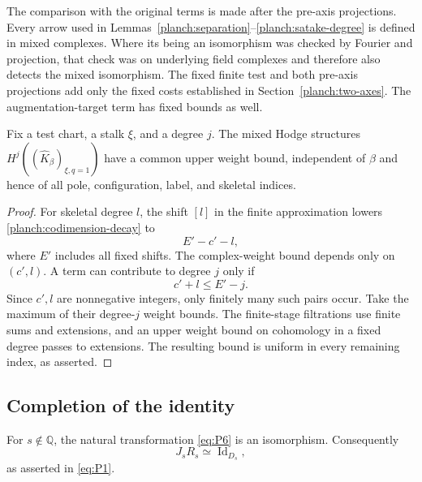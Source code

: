 The comparison with the original terms is made after the pre-axis
projections.  Every arrow used in
Lemmas~\ref{planch:separation}--\ref{planch:satake-degree} is
defined in mixed complexes.  Where its being an isomorphism was
checked by Fourier and projection, that check was on underlying
field complexes and therefore also detects the mixed isomorphism.
The fixed finite test and both pre-axis projections add only the
fixed costs established in Section~\ref{planch:two-axes}.
The augmentation-target term has fixed bounds as well.

\begin{proposition}
\label{planch:weight-estimate}
Fix a test chart, a stalk $\xi$, and a degree $j$.  The mixed Hodge
structures $H^j((\widehat K_\beta)_{\xi,q=1})$ have a common upper
weight bound, independent of $\beta$ and hence of all pole,
configuration, label, and skeletal indices.
\end{proposition}

\begin{proof}
For skeletal degree $l$, the shift $[l]$ in the finite approximation
lowers \eqref{planch:codimension-decay} to
\[
 E'-c'-l,
\]
where $E'$ includes all fixed shifts.  The complex-weight bound
depends only on $(c',l)$.  A term can contribute to degree $j$
only if
\[
 c'+l\leq E'-j.
\]
Since $c',l$ are nonnegative integers, only finitely many such
pairs occur.  Take the maximum of their degree-$j$ weight bounds.
The finite-stage filtrations use finite sums and extensions, and
an upper weight bound on cohomology in a fixed degree passes to
extensions.  The resulting bound is uniform in every remaining
index, as asserted.
\end{proof}

\subsection{Completion of the identity}

\begin{theorem}
\label{planch:identity}
For $s\notin\mathbb Q$, the natural transformation \eqref{eq:P6}
is an isomorphism.  Consequently
\[
 J_sR_s\simeq\operatorname{Id}_{D_s},
\]
as asserted in \eqref{eq:P1}.
\end{theorem}

